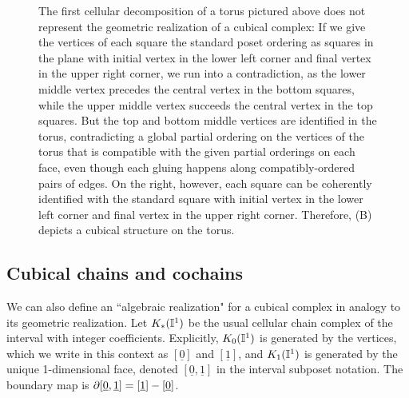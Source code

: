 \begin{figure}
	
	\caption{The first cellular decomposition of a torus pictured above does not represent the geometric realization of a cubical complex: If we give the vertices of each square the standard poset ordering as squares in the plane with initial vertex in the lower left corner and final vertex in the upper right corner, we run into a contradiction, as the lower middle vertex precedes the central vertex in the bottom squares, while the upper middle vertex succeeds the central vertex in the top squares.
	But the top and bottom middle vertices are identified in the torus, contradicting a global partial ordering on the vertices of the torus that is compatible with the given partial orderings on each face, even though each gluing happens along compatibly-ordered pairs of edges.
	On the right, however, each square can be coherently identified with the standard square with initial vertex in the lower left corner and final vertex in the upper right corner.
	Therefore, (B) depicts a cubical structure on the torus.}
\label{F: cubical structure}
\end{figure}

\subsection{Cubical chains and cochains}\label{S: cubical cochains}

We can also define an ``algebraic realization" for a cubical complex in analogy to its geometric realization.
Let $K_*(\mathbb{I}^1)$ be the usual cellular chain complex of the interval with integer coefficients.
Explicitly, $K_0(\mathbb{I}^1)$ is generated by the vertices, which we write in this context as $[\underline{0}]$ and $[\underline{1}]$, and $K_1(\mathbb{I}^1)$ is generated by the unique 1-dimensional face, denoted $[\underline{0},\underline{1}]$ in the interval subposet notation.
The boundary map is $\partial [\underline{0},\underline{1}] = [\underline{1}]-[\underline{0}]$.

